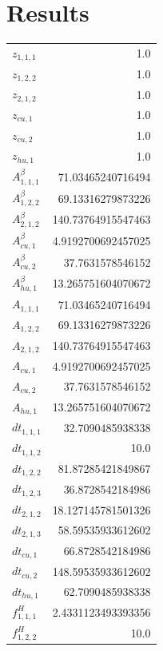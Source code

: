 \documentclass{article}%
\makeatletter
\let\mcnewpage=\newpage%
\newcommand{\TrickSupertabularIntoMulticols}{%
\renewcommand\newpage{%
\if@firstcolumn%
\hrule width\linewidth height0pt%
\columnbreak%
\else%
\mcnewpage%
\fi%
}%
}%
\makeatother
\begin{document}
\section{Results}%
\thispagestyle{plain}%
\begin{multicols*}{3}%
\TrickSupertabularIntoMulticols%
%
\begin{supertabular}{lr}%
	$z_{1,1,1}$ & 1.0 \\%
	$z_{1,2,2}$ & 1.0 \\%
	$z_{2,1,2}$ & 1.0 \\%
	$z_{cu,1}$ & 1.0 \\%
	$z_{cu,2}$ & 1.0 \\%
	$z_{hu,1}$ & 1.0 \\%
	$A_{1,1,1}^{\beta}$ & 71.03465240716494 \\%
	$A_{1,2,2}^{\beta}$ & 69.13316279873226 \\%
	$A_{2,1,2}^{\beta}$ & 140.73764915547463 \\%
	$A_{cu,1}^{\beta}$ & 4.9192700692457025 \\%
	$A_{cu,2}^{\beta}$ & 37.7631578546152 \\%
	$A_{hu,1}^{\beta}$ & 13.265751604070672 \\%
	$A_{1,1,1}$ & 71.03465240716494 \\%
	$A_{1,2,2}$ & 69.13316279873226 \\%
	$A_{2,1,2}$ & 140.73764915547463 \\%
	$A_{cu,1}$ & 4.9192700692457025 \\%
	$A_{cu,2}$ & 37.7631578546152 \\%
	$A_{hu,1}$ & 13.265751604070672 \\%
	$dt_{1,1,1}$ & 32.7090485938338 \\%
	$dt_{1,1,2}$ & 10.0 \\%
	$dt_{1,2,2}$ & 81.87285421849867 \\%
	$dt_{1,2,3}$ & 36.8728542184986 \\%
	$dt_{2,1,2}$ & 18.127145781501326 \\%
	$dt_{2,1,3}$ & 58.59535933612602 \\%
	$dt_{cu,1}$ & 66.8728542184986 \\%
	$dt_{cu,2}$ & 148.59535933612602 \\%
	$dt_{hu,1}$ & 62.7090485938338 \\%
	$f_{1,1,1}^{H}$ & 2.4331123493393356 \\%
	$f_{1,2,2}^{H}$ & 10.0 \\%

\end{supertabular}
\end{multicols*}
\end{document}
